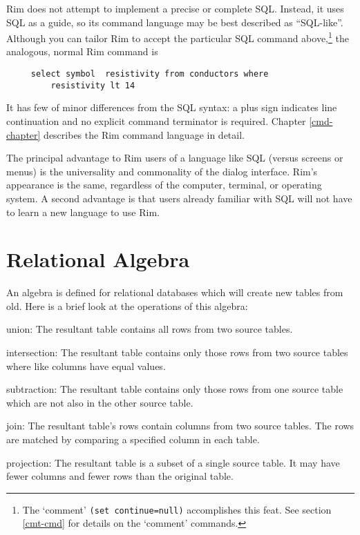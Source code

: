 \documentclass[11pt,a4paper]{report}
\begin{document}
 
Rim does not attempt to implement a precise or complete SQL.
Instead, it uses SQL as a guide, so its command language
may be best described as ``SQL-like''.
Although you can tailor Rim to accept the particular
SQL command above,\footnote{The `comment' {\tt  *(set continue=null)}
 accomplishes this feat. See section \ref{cmt-cmd}
 for details on the `comment' commands.}
 the analogous, normal Rim command is
 
\begin{verbatim}
     select symbol  resistivity from conductors where
         resistivity lt 14
\end{verbatim}
 
\noindent
It has few of minor differences from the SQL syntax:
a plus sign
indicates line continuation and no explicit command terminator is required.
Chapter \ref{cmd-chapter} describes the Rim command language
in detail.
 
The principal advantage to Rim users of a language like SQL
(versus screens or menus) is the universality
and commonality of the dialog interface.  Rim's appearance
is the same, regardless of the computer, terminal, or operating
system.
A second advantage is that users already familiar with
SQL will not have to learn a new language to use Rim.
 
\section{Relational Algebra}
 
An algebra is defined for relational databases which will
create new tables from old.  Here is a brief look
at the operations of this algebra:
 
\begin{List}
\item[union:] The resultant table contains all rows from
  two source tables.
 
\item[intersection:] The resultant table contains only  those rows from
  two source tables where like columns have equal values.
 
\item[subtraction:] The resultant table contains only those rows from
  one source table which are not also in the other source table.
 
\item[join:] The resultant table's rows contain columns from
  two source tables.  The rows are matched by comparing a specified
  column in each table.
 
\item[projection:] The resultant table is a subset of a single
  source table.  It may have fewer columns and fewer rows
  than the original table.
 
\end{List}
 
\end{document}
